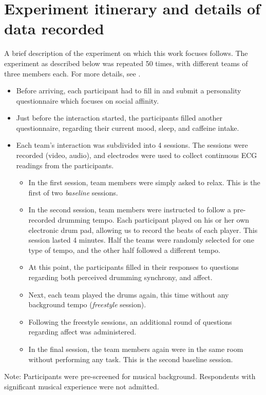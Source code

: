 \documentclass[a4paper, 11pt]{report}      %
\begin{document}
\section{Experiment itinerary and details of data recorded}
A brief description of the experiment on which this work focuses follows. The experiment as described below was repeated 50 times, with different teams of three members each. For more details, see \cite{gordon2020physio}.
\begin{itemize}
    \item Before arriving, each participant had to fill in and submit a personality questionnaire which focuses on social affinity.
    \item Just before the interaction started, the participants filled another questionnaire, regarding their current mood, sleep, and caffeine intake.

    \item Each team's interaction was subdivided into 4 sessions. The sessions were recorded (video, audio), and electrodes were used to collect continuous ECG readings from the participants. 
    \begin{itemize}
        \item In the first session, team members were simply asked to relax. This is the first of two \emph{baseline} sessions.
        \item In the second session, team members were instructed to follow a pre-recorded drumming tempo. Each participant played on his or her own electronic drum pad, allowing us to record the beats of each player. This session lasted 4 minutes. Half the teams were randomly selected for one type of tempo, and the other half followed a different tempo.
        \item At this point, the participants filled in their responses to questions regarding both perceived drumming synchrony, and affect.
        \item Next, each team played the drums again, this time without any background tempo (\emph{freestyle} session).
        \item Following the freestyle sessions, an additional round of questions regarding affect was administered. 
        \item In the final session, the team members again were in the same room without performing any task. This is the second baseline session.
    \end{itemize}
\end{itemize}
Note: Participants were pre-screened for musical  background. Respondents with significant musical experience were not admitted.





\end{document}
